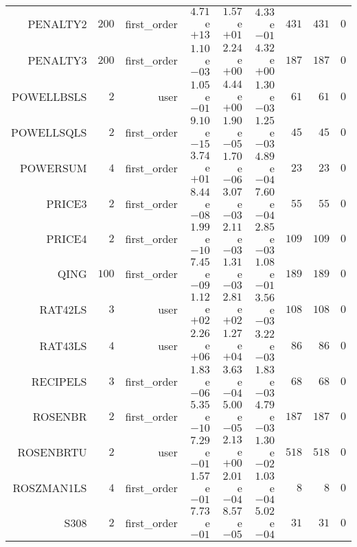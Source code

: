\begin{longtable}{rrrrrrrrr}
PENALTY2 & \(   200\) & first\_order & \( 4.71\)e\(+13\) & \( 1.57\)e\(+01\) & \( 4.33\)e\(-01\) & \(   431\) & \(   431\) & \(     0\) \\
PENALTY3 & \(   200\) & first\_order & \( 1.10\)e\(-03\) & \( 2.24\)e\(+00\) & \( 4.32\)e\(+00\) & \(   187\) & \(   187\) & \(     0\) \\
POWELLBSLS & \(     2\) & user & \( 1.05\)e\(-01\) & \( 4.44\)e\(+00\) & \( 1.30\)e\(-03\) & \(    61\) & \(    61\) & \(     0\) \\
POWELLSQLS & \(     2\) & first\_order & \( 9.10\)e\(-15\) & \( 1.90\)e\(-05\) & \( 1.25\)e\(-03\) & \(    45\) & \(    45\) & \(     0\) \\
POWERSUM & \(     4\) & first\_order & \( 3.74\)e\(+01\) & \( 1.70\)e\(-06\) & \( 4.89\)e\(-04\) & \(    23\) & \(    23\) & \(     0\) \\
PRICE3 & \(     2\) & first\_order & \( 8.44\)e\(-08\) & \( 3.07\)e\(-03\) & \( 7.60\)e\(-04\) & \(    55\) & \(    55\) & \(     0\) \\
PRICE4 & \(     2\) & first\_order & \( 1.99\)e\(-10\) & \( 2.11\)e\(-03\) & \( 2.85\)e\(-03\) & \(   109\) & \(   109\) & \(     0\) \\
QING & \(   100\) & first\_order & \( 7.45\)e\(-09\) & \( 1.31\)e\(-03\) & \( 1.08\)e\(-01\) & \(   189\) & \(   189\) & \(     0\) \\
RAT42LS & \(     3\) & user & \( 1.12\)e\(+02\) & \( 2.81\)e\(+02\) & \( 3.56\)e\(-03\) & \(   108\) & \(   108\) & \(     0\) \\
RAT43LS & \(     4\) & user & \( 2.26\)e\(+06\) & \( 1.27\)e\(+04\) & \( 3.22\)e\(-03\) & \(    86\) & \(    86\) & \(     0\) \\
RECIPELS & \(     3\) & first\_order & \( 1.83\)e\(-06\) & \( 3.63\)e\(-04\) & \( 1.83\)e\(-03\) & \(    68\) & \(    68\) & \(     0\) \\
ROSENBR & \(     2\) & first\_order & \( 5.35\)e\(-10\) & \( 5.00\)e\(-05\) & \( 4.79\)e\(-03\) & \(   187\) & \(   187\) & \(     0\) \\
ROSENBRTU & \(     2\) & user & \( 7.29\)e\(-01\) & \( 2.13\)e\(+00\) & \( 1.30\)e\(-02\) & \(   518\) & \(   518\) & \(     0\) \\
ROSZMAN1LS & \(     4\) & first\_order & \( 1.57\)e\(-01\) & \( 2.01\)e\(-04\) & \( 1.03\)e\(-04\) & \(     8\) & \(     8\) & \(     0\) \\
S308 & \(     2\) & first\_order & \( 7.73\)e\(-01\) & \( 8.57\)e\(-05\) & \( 5.02\)e\(-04\) & \(    31\) & \(    31\) & \(     0\) \\

\end{longtable}
